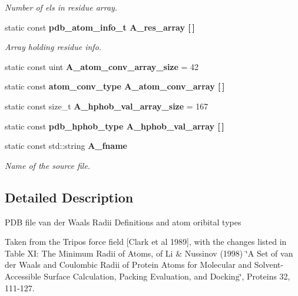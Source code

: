 \begin{CompactItemize}
\begin{CompactList}\small\item\em Number of els in residue array. \item\end{CompactList}\item 
static const \bf{pdb\_\-atom\_\-info\_\-t} \bf{A\_\-res\_\-array} [$\,$]\label{classSimSite3D_1_1PDB__residues_7b64a47671ba736cf508b89f59b17fab}

\begin{CompactList}\small\item\em Array holding residue info. \item\end{CompactList}\item 
static const uint \textbf{A\_\-atom\_\-conv\_\-array\_\-size} = 42\label{classSimSite3D_1_1PDB__residues_90f14b7d94a4e172f99e1e68c41fa9d5}

\item 
static const \bf{atom\_\-conv\_\-type} \textbf{A\_\-atom\_\-conv\_\-array} [$\,$]\label{classSimSite3D_1_1PDB__residues_ba8d329e1c656046f504351cf5dbeeda}

\item 
static const size\_\-t \textbf{A\_\-hphob\_\-val\_\-array\_\-size} = 167\label{classSimSite3D_1_1PDB__residues_e5b8bfbc4c3ea26687e0ca82b1b44d45}

\item 
static const \bf{pdb\_\-hphob\_\-type} \textbf{A\_\-hphob\_\-val\_\-array} [$\,$]\label{classSimSite3D_1_1PDB__residues_e94cb2cd3cdf8c693adb2a7cddfd98be}

\item 
static const std::string \bf{A\_\-fname}\label{classSimSite3D_1_1PDB__residues_0b71b0db5fafc2e45019bd1e91f97484}

\begin{CompactList}\small\item\em Name of the source file. \item\end{CompactList}\end{CompactItemize}


\subsection{Detailed Description}
PDB file van der Waals Radii Definitions and atom oribital types

Taken from the Tripos force field [Clark et al 1989], with the changes listed in Table XI: The Minimum Radii of Atoms, of Li \& Nussinov (1998) \char`\"{}A Set of van der Waals and Coulombic Radii of Protein Atoms for Molecular and Solvent-Accessible Surface Calculation, Packing Evaluation, and Docking\char`\"{}, Proteins 32, 111-127.


